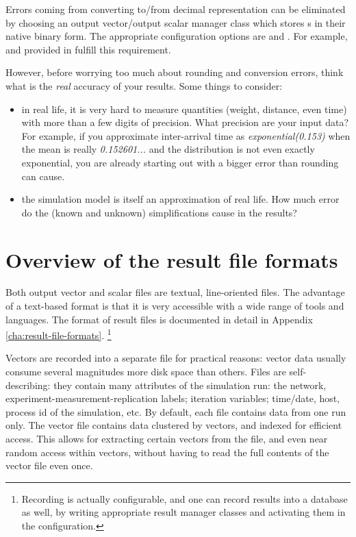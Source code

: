 Errors coming from converting to/from decimal representation can be
eliminated by choosing an output vector/output scalar manager class
which stores s in their native binary form.
The appropriate configuration options are 
and . For example,
 and 
provided in  fulfill this requirement.

However, before worrying too much about rounding and conversion errors,
think what is the \textit{real} accuracy of your results.
Some things to consider:

\begin{itemize}
  \item{in real life, it is very hard to measure quantities (weight, distance,
     even time) with more than a few digits of precision. What precision
     are your input data? For example, if you approximate inter-arrival
     time as \textit{exponential(0.153)} when the mean is really
     \textit{0.152601...} and the distribution is not even exactly exponential,
     you are already starting out with a bigger error than rounding can cause.}

  \item{the simulation model is itself an approximation of real life. How much
     error do the (known and unknown) simplifications cause in the results?}
\end{itemize}



\section{Overview of the result file formats}

Both output vector and scalar files are textual, line-oriented files.
The advantage of a text-based format is that it is very accessible
with a wide range of tools and languages. The format of result files is
documented in detail in Appendix \ref{cha:result-file-formats}.
  \footnote{Recording is actually configurable, and one can record
  results into a database as well, by writing appropriate result
  manager classes and activating them in the configuration.}

Vectors are recorded into a separate file for practical reasons: vector
data usually consume several magnitudes more disk space than others. Files
are self-describing: they contain many attributes of the simulation run:
the network, experiment-measurement-replication labels; iteration
variables; time/date, host, process id of the simulation, etc. By default,
each file contains data from one run only.
The vector file contains data clustered by vectors, and indexed for
efficient access. This allows for extracting certain vectors from the file,
and even near random access within vectors, without having to read the full
contents of the vector file even once.

